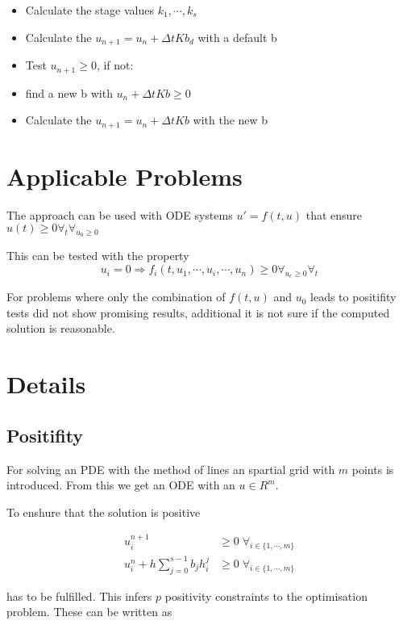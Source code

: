 \documentclass{article}
\begin{document}
\begin{itemize}
\item Calculate the stage values $k_1,\cdots,k_s$
\item Calculate the $u_{n+1} = u_n + \Delta t K b_{d}$ with a default b
\item Test $u_{n+1} \geq 0$, if not:
\item find a new b with $u_n + \Delta t K b \geq 0$
\item Calculate the $u_{n+1} = u_n + \Delta t K b$ with the new b
\end{itemize}


\section{Applicable Problems}
The approach can be used with ODE systems $u' = f(t,u)$ that ensure  $u(t) \geq 0 \forall_t \forall_{  u_0 \geq 0}$ 

This can be tested with the property 
\begin{equation}
u_i=0 \Rightarrow f_i(t,u_1,\cdots,u_i,\cdots,u_n) \geq 0  \forall_{u_c \geq 0} \forall_{t}
\end{equation}

For problems where only the combination of $f(t,u)$ and $u_0$ leads to positifity tests did not show promising results, additional it is not sure if the computed solution is reasonable.

\section{Details}

\subsection{Positifity}
For solving an PDE with the method of lines an spartial grid  with $m$ points is introduced. 
From this we get an ODE with an $u \in R^m$.

To enshure that the solution is positive 

\begin{align}
 u_i^{n+1} &\geq 0   \;   \forall_{i \in \{1, \cdots,m \}}  \\
 u_i^n + h \sum_{j=0}^{s-1} b_j h_i^j  &\geq 0   \;   \forall_{i \in \{1,\cdots,m \}}  
\end{align}

has to be fulfilled.
This infers $p$ positivity constraints to the optimisation problem. These can be written as
\end{document}
